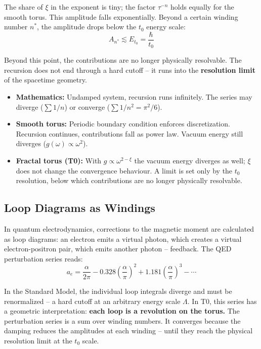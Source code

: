 	The share of $\xi$ in the exponent is tiny; the factor $\tau^{-n}$ holds equally for the smooth torus. This amplitude falls exponentially. Beyond a certain winding number $n^*$, the amplitude drops below the $t_0$ energy scale:
	\begin{equation}
		A_{n^*} \lesssim E_{t_0} = \frac{\hbar}{t_0}
	\end{equation}
	
	Beyond this point, the contributions are no longer physically resolvable. The recursion does not end through a hard cutoff -- it runs into the \textbf{resolution limit} of the spacetime geometry.
	
	\begin{keypoint}
		\begin{itemize}
			\item \textbf{Mathematics:} Undamped system, recursion runs infinitely. The series may diverge ($\sum 1/n$) or converge ($\sum 1/n^2 = \pi^2/6$).
			\item \textbf{Smooth torus:} Periodic boundary condition enforces discretization. Recursion continues, contributions fall as power law. Vacuum energy still diverges ($g(\omega) \propto \omega^2$).
			\item \textbf{Fractal torus (T0):} With $g \propto \omega^{2-\xi}$ the vacuum energy diverges as well; $\xi$ does not change the convergence behaviour. A limit is set only by the $t_0$ resolution, below which contributions are no longer physically resolvable.
		\end{itemize}
	\end{keypoint}
	
	\subsection{Loop Diagrams as Windings}
	
	In quantum electrodynamics, corrections to the magnetic moment are calculated as loop diagrams: an electron emits a virtual photon, which creates a virtual electron-positron pair, which emits another photon -- feedback. The QED perturbation series reads:
	\begin{equation}
		a_e = \frac{\alpha}{2\pi} - 0.328 \left(\frac{\alpha}{\pi}\right)^2 + 1.181 \left(\frac{\alpha}{\pi}\right)^3 - \cdots
	\end{equation}
	
	In the Standard Model, the individual loop integrals diverge and must be renormalized -- a hard cutoff at an arbitrary energy scale $\Lambda$. In T0, this series has a geometric interpretation: \textbf{each loop is a revolution on the torus.} The perturbation series is a sum over winding numbers. It converges because the damping reduces the amplitudes at each winding -- until they reach the physical resolution limit at the $t_0$ scale.
	
